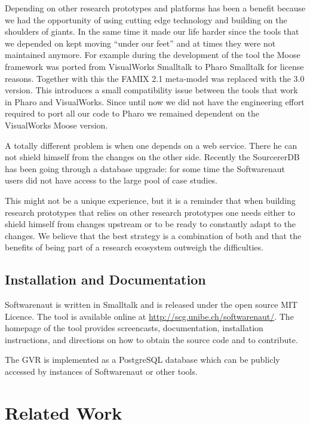 \documentclass[preprint,12pt]{elsarticle}
\begin{document}
Depending on other research prototypes and platforms has been a benefit because we had the opportunity of using cutting edge technology and building on the shoulders of giants. In the same time it made our life harder since the tools that we depended on kept moving ``under our feet'' and at times they were not maintained anymore. For example during the development of the tool the Moose framework was ported from VisualWorks Smalltalk to Pharo Smalltalk for license reasons. Together with this the FAMIX 2.1 meta-model was replaced with the 3.0 version. This introduces a small compatibility issue between the tools that work in Pharo and VisualWorks. Since until now we did not have the engineering effort required to port all our code to Pharo we remained dependent on the VisualWorks Moose version. 

A totally different problem is when one depends on a web service. There he can not shield himself from the changes on the other side. Recently the SourcererDB has been going through a database upgrade: for some time the Softwarenaut users did not have access to the large pool of case studies.

This might not be a unique experience, but it is a reminder that when building research prototypes that relies on other research prototypes one needs either to shield himself from changes upstream or to be ready to constantly adapt to the changes. We believe that the best strategy is a combination of both and that the benefits of being part of a research ecosystem outweigh the difficulties.

\subsection {Installation and Documentation}

Softwarenaut is written in Smalltalk and is released under the open source MIT Licence. The tool is available online at {\footnotesize \url{http://scg.unibe.ch/softwarenaut/}}. The homepage of the tool provides screencasts, documentation, installation instructions, and directions on how to obtain the source code and to contribute.

The GVR is implemented as a PostgreSQL database which can be publicly accessed by instances of Softwarenaut or other tools. 

\section {Related Work} \label {sec:rel}
\end{document}
